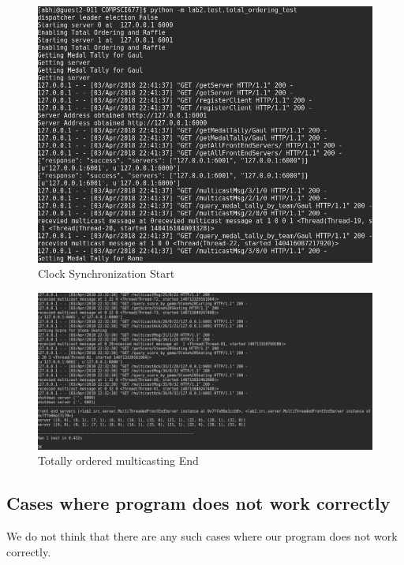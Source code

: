 \documentclass{article}
\begin{document}
\begin{figure}[H]
        \centering
        \includegraphics[width=\textwidth]{outputs/total_ordering_test_start.png}
        \caption{Clock Synchronization Start \label{fig:clong_synchronization}}
\end{figure}

\begin{figure}[H]
        \centering
        \includegraphics[width=\textwidth]{outputs/total_order_test.png}
        \caption{Totally ordered multicasting End \label{fig:clong_synchronization}}
\end{figure}



\subsection{Cases where program does not work correctly}
We do not think that there are any such cases where our program does not work
correctly.
\end{document}
